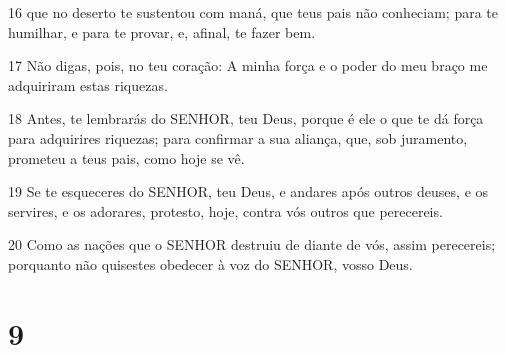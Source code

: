 \par 16 que no deserto te sustentou com maná, que teus pais não conheciam; para te humilhar, e para te provar, e, afinal, te fazer bem.
\par 17 Não digas, pois, no teu coração: A minha força e o poder do meu braço me adquiriram estas riquezas.
\par 18 Antes, te lembrarás do SENHOR, teu Deus, porque é ele o que te dá força para adquirires riquezas; para confirmar a sua aliança, que, sob juramento, prometeu a teus pais, como hoje se vê.
\par 19 Se te esqueceres do SENHOR, teu Deus, e andares após outros deuses, e os servires, e os adorares, protesto, hoje, contra vós outros que perecereis.
\par 20 Como as nações que o SENHOR destruiu de diante de vós, assim perecereis; porquanto não quisestes obedecer à voz do SENHOR, vosso Deus.

\chapter{9}

